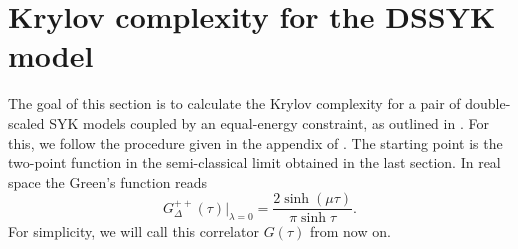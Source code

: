 \documentclass{article}
\numberwithin{equation}{section}
\begin{document}
\section{Krylov complexity for the DSSYK model}
The goal of this section is to calculate the Krylov complexity for a pair of double-scaled SYK models coupled by an equal-energy constraint, as outlined in \cite{Narovlansky:2023lfz}. For this, we follow the procedure given in the appendix of \cite{Parker:2018yvk}. The starting point is the two-point function in the semi-classical limit obtained in the last section. In real space the Green's function reads
\begin{equation}
\label{2pf}
    G^{++}_\Delta(\tau)|_{\lambda=0}=\frac{2\sinh(\mu\tau)}{\pi \sinh{\tau}}.
\end{equation}
For simplicity, we will call this correlator $G(\tau)$ from now on.
\end{document}
